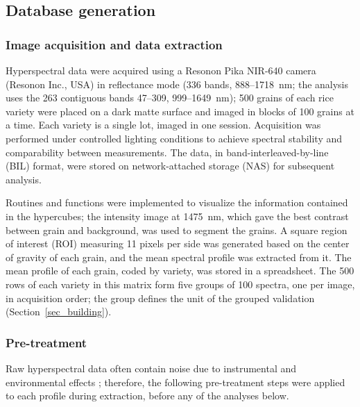 \documentclass[final,5p,times,twocolumn]{elsarticle}
\newcommand{\added}[1]{#1}
\begin{document}
\subsection{Database generation}\label{sec_database}

\subsubsection{Image acquisition and data extraction} 

Hyperspectral data were acquired using a Resonon Pika NIR-640 camera (Resonon Inc., USA) in reflectance mode (336 bands, 888--1718~nm; the analysis uses the 263 contiguous bands 47--309, 999--1649~nm); 500 grains of each rice variety were placed on a dark matte surface and imaged in blocks of 100 grains at a time. Each variety is a single lot, imaged in one session.
Acquisition was performed under controlled lighting conditions to achieve spectral stability and comparability between measurements.
The data, in band-interleaved-by-line (BIL) format, were stored on network-attached storage (NAS) for subsequent analysis. 

Routines and functions were implemented to visualize the information contained in the hypercubes; the intensity image at 1475~nm, which gave the best contrast between grain and background, was used to segment the grains.
A square region of interest (ROI) measuring 11 pixels per side was generated based on the center of gravity of each grain, and the mean spectral profile was extracted from it.
The mean profile of each grain, coded by variety, was stored in a spreadsheet.
\added{The 500 rows of each variety in this matrix form five groups of 100 spectra, one per image, in acquisition order; the group defines the unit of the grouped validation (Section~\ref{sec_building}).}

\subsubsection{Pre-treatment}

Raw hyperspectral data often contain noise due to instrumental and environmental effects \citep{vasquez2018}; therefore, the following pre-treatment steps were applied to each profile during extraction, before any of the analyses below.
\end{document}
